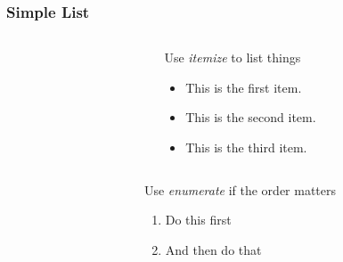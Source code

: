 \begin{frame}[fragile]
  \frametitle{Simple List}
  \begin{columns}
    \begin{column}{0.51\textwidth}
      
    \end{column}
    \begin{column}{0.49\textwidth}
      Use \emph{itemize} to list things
      
      \begin{itemize}
      \item This is the first item. 
      \item This is the second item.
      \item This is the third item.
      \end{itemize}
    \end{column}
  \end{columns}

  \begin{columns}
    \begin{column}{0.51\textwidth}
      
    \end{column}
    \begin{column}{0.49\textwidth}
      Use \emph{enumerate} if the order matters
      
      \begin{enumerate}
      \item Do this first
      \item And then do that
      \end{enumerate}
    \end{column}
  \end{columns}

\end{frame}

